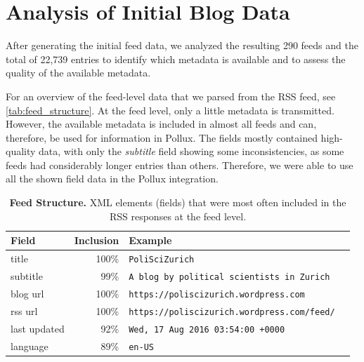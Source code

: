 \documentclass{article}
\begin{document}
\section{Analysis of Initial Blog Data}\label{sec:analysis}

After generating the initial feed data, we analyzed the resulting 290 feeds and the total of 22,739 entries to identify which metadata is available and to assess the quality of the available metadata.

For an overview of the feed-level data that we parsed from the RSS feed, see \autoref{tab:feed_structure}.
At the feed level, only a little metadata is transmitted. However, the available metadata is included in almost all feeds and can, therefore, be used for information in Pollux. The fields mostly contained high-quality data, with only the \textit{subtitle} field showing some inconsistencies, as some feeds had considerably longer entries than others. Therefore, we were able to use all the shown field data in the Pollux integration.
\begin{table}[htb]
    \caption{\textbf{Feed Structure.} XML elements (fields) that were most often included in the RSS responses at the feed level.}
    \centering
    \begin{tabular}{lrl}
        \toprule
        \cmidrule(r){1-2}
        \textbf{Field} & \textbf{Inclusion} & \textbf{Example}                                   \\
        \midrule
        title          & 100\%              & \verb|PoliSciZurich                              | \\
        subtitle       & 99\%               & \verb|A blog by political scientists in Zurich   | \\
        blog url       & 100\%              & \verb|https://poliscizurich.wordpress.com        | \\
        rss url        & 100\%              & \verb|https://poliscizurich.wordpress.com/feed/  | \\
        last updated   & 92\%               & \verb|Wed, 17 Aug 2016 03:54:00 +0000            | \\
        language       & 89\%               & \verb|en-US|                                       \\
        \bottomrule
    \end{tabular}
    \label{tab:feed_structure}
\end{table}
\end{document}
